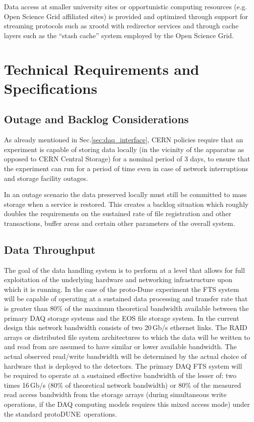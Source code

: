 \documentclass[pdftex,12pt,letter]{article}
\newcommand{\pd}{protoDUNE\ }
\begin{document}
Data access at smaller university sites or opportunistic computing resources (e.g. Open Science Grid
affiliated sites) is provided and optimized through support for streaming protocols such as xrootd with redirector
services and through cache layers such as the “stash cache” system employed by the Open Science Grid.  

\section{Technical Requirements and Specifications}

\subsection{Outage and Backlog Considerations}
\label{sec:backlog}
As already mentioned in Sec.\ref{sec:daq_interface},
CERN policies require that an experiment is capable of storing data locally (in the vicinity of the apparatus as opposed to CERN Central
Storage)  for a nominal period of 3 days, to ensure that the experiment can run for a period of time even in case of network interruptions
and storage facility outages.

In an outage scenario the data preserved locally must still be committed to mass storage when a service is restored.
This creates a backlog situation which roughly doubles the requirements on the sustained rate of file registration and other transactions, buffer
areas and certain other parameters of the overall system.


\subsection{Data Throughput}

The goal of the data handling system is to perform at a level that allows for full exploitation of the underlying hardware and networking infrastructure
upon which  it is running.  In the case of the proto-Dune experiment the FTS system will be capable of operating at a sustained data processing and transfer
rate that is greater than 80\% of the maximum theoretical bandwidth available between the primary DAQ storage systems and the EOS file storage system.
 In the current design this network bandwidth consists of two 20\,Gb/s ethernet links.  The RAID arrays or distributed file system architectures to which the
data will be written to and read from are assumed to have similar or lower available bandwidth.  The actual observed read/write bandwidth will be determined
by the actual choice of hardware that is deployed to the detectors.  The primary DAQ FTS system will be required to operate at a sustained effective bandwidth
of the lesser of: two times 16\,Gb/s (80\% of theoretical network bandwidth) or 80\% of the measured read access bandwidth from the storage arrays
(during simultaneous write operations, if the DAQ computing models requires this mixed access mode) under the standard \pd operations.
\end{document}
